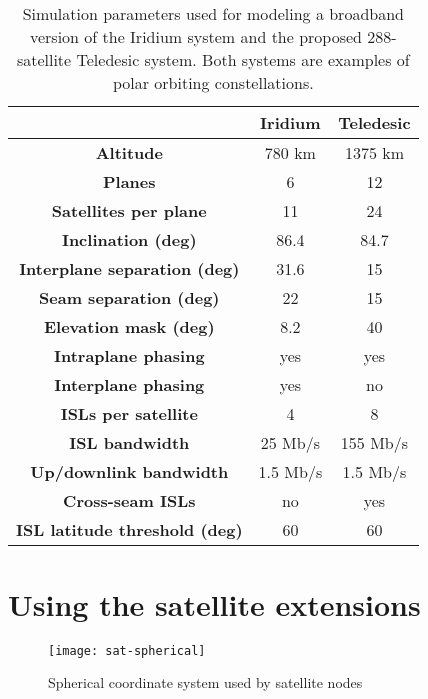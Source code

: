 \begin{table}[h]
\begin{center}
{\tt
\begin{tabular}{|c||c|c|}\hline
& {\bf Iridium} & {\bf Teledesic}\\\hline\hline
{\bf Altitude} & \rm 780 km& \rm 1375 km\\\hline
{\bf Planes} & \rm 6& \rm 12\\\hline
{\bf Satellites per plane} & \rm 11 & \rm 24\\\hline
{\bf Inclination (deg)} & \rm 86.4 & \rm 84.7\\\hline
{\bf Interplane separation (deg)} & \rm 31.6 & \rm 15\\\hline
{\bf Seam separation (deg)} & \rm 22 & \rm 15\\\hline
{\bf Elevation mask (deg)} & \rm 8.2 & \rm 40\\\hline
{\bf Intraplane phasing} & \rm yes & \rm yes\\\hline
{\bf Interplane phasing} & \rm yes & \rm no\\\hline
{\bf ISLs per satellite} & \rm 4  & \rm 8\\\hline
{\bf ISL bandwidth} & \rm 25 Mb/s  & \rm 155 Mb/s\\\hline
{\bf Up/downlink bandwidth} & \rm 1.5 Mb/s  & \rm 1.5 Mb/s\\\hline
{\bf Cross-seam ISLs} & \rm no & \rm yes\\\hline
{\bf ISL latitude threshold (deg)} & \rm 60 & \rm 60\\\hline
\end{tabular}
}
\end{center}
\caption{Simulation parameters used for modeling a broadband version of
the Iridium system and the proposed 288-satellite Teledesic system.
Both systems are examples of polar orbiting constellations.
}
\end{table}
\clearpage

\section{Using the satellite extensions}
\label{sec:satellite/usage}

\begin{figure}
    \centerline{\texttt{[image: sat-spherical]}}
    \caption{Spherical coordinate system used by satellite nodes}
    \label{fig:spherical}
\end{figure}


